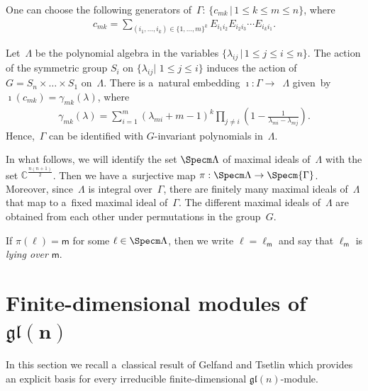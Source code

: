 One can choose the following generators of~$\Gamma$: $\{c_{mk} \,|\, 1\leq k\leq m\leq n \}$, where
\begin{gather}
\label{equ_3}
c_{mk}= {\sum\limits_{(i_1,\ldots,i_k)\in \{1,\ldots,m \}^k}} E_{i_1 i_2}E_{i_2 i_3}\cdots E_{i_k i_1}.
\end{gather}

Let~$\Lambda$ be the polynomial algebra in the variables $\{\lambda_{ij}\, | \, 1\leqslant j\leqslant i\leqslant n \}$.
The action of the symmetric group $S_i$ on $\{\lambda_{ij} |$ $1\leqslant j\leqslant i\}$ induces the action of $G = S_n
\times\dots \times S_1$ on~$\Lambda$.
There is a~natural embedding $\imath:{{\Gamma}}{\longrightarrow}$~$\Lambda$ given~by
$\imath(c_{mk})=\gamma_{mk}(\lambda)$, where
\begin{gather}
\label{def-gamma}
\gamma_{mk}(\lambda)=\sum\limits_{i=1}^m (\lambda_{mi}+m-1)^k \prod\limits_{j\ne i} \left(1-\frac{1}{\lambda_{mi}-\lambda_{mj}} \right).
\end{gather}
Hence,~$\Gamma$ can be identif\/ied with $G$-invariant polynomials in~$\Lambda$.

\begin{Remark}
\label{maximal ideals differ by permutations}
In what follows, we will identify the set $\Specm \Lambda$ of maximal ideals of~$\Lambda$ with the set
$\mathbb{C}^{\frac{n(n+1)}{2}}$.
Then we have a~surjective map $\pi: \Specm\Lambda \rightarrow \Specm{\Gamma}$.
Moreover, since~$\Lambda$ is integral over~$\Gamma$, there are f\/initely many maximal ideals of~$\Lambda$ that map to
a~f\/ixed maximal ideal of~$\Gamma$.
The dif\/ferent maximal ideals of~$\Lambda$ are obtained from each other under permutations in the group~$G$.
\end{Remark}
If $\pi(\ell)=\mathsf m$ for some $\ell\in \Specm \Lambda$, then we write $\ell=\ell_{\mathsf m}$ and say that
$\ell_{\mathsf m}$ is {\it lying over} $\mathsf m$.

\section[Finite-dimensional modules of $\mathfrak{gl}(n)$]{Finite-dimensional modules of $\boldsymbol{\mathfrak{gl}(n)}$}
\label{section4}

In this section we recall a~classical result of Gelfand and Tsetlin which provides an explicit basis for every
irreducible f\/inite-dimensional $\mathfrak{gl}(n)$-module.


